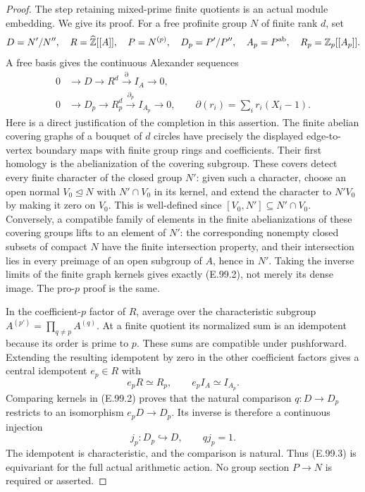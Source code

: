 \begin{proof}
The step retaining mixed-prime finite quotients is an actual module
embedding.  We give its proof.  For a free profinite group \(N\) of
finite rank \(d\), set
\[
 D=N'/N'',\quad R=\widehat{\mathbb Z}[[A]],\quad
 P=N^{(p)},\quad D_p=P'/P'',\quad
 A_p=P^{\rm ab},\quad R_p=\mathbb Z_p[[A_p]].
\]
A free basis gives the continuous Alexander sequences
\[
\begin{aligned}
 0&\longrightarrow D\longrightarrow R^d
          \xrightarrow{\partial}I_A\longrightarrow0,\\
 0&\longrightarrow D_p\longrightarrow R_p^d
          \xrightarrow{\partial_p}I_{A_p}\longrightarrow0,
 \qquad \partial(r_i)=\sum_i r_i(X_i-1).
\end{aligned}                                                   \tag{E.99.2}
\]
Here is a direct justification of the completion in this assertion.
The finite abelian covering graphs of a bouquet of \(d\) circles
have precisely the displayed edge-to-vertex boundary maps with
finite group rings and coefficients.  Their first homology is the
abelianization of the covering subgroup.  These covers detect every
finite character of the closed group \(N'\): given such a character,
choose an open normal \(V_0\trianglelefteq N\) with
\(N'\cap V_0\) in its kernel, and extend the character to \(N'V_0\)
by making it zero on \(V_0\).  This is well-defined since
\([V_0,N']\subseteq N'\cap V_0\).
Conversely, a compatible family of elements in the finite
abelianizations of these covering groups lifts to an element of
\(N'\): the corresponding nonempty closed subsets of compact \(N\)
have the finite intersection property, and their intersection lies
in every preimage of an open subgroup of \(A\), hence in \(N'\).
Taking the inverse limits of the finite graph kernels gives exactly
(E.99.2), not merely its dense image.  The pro-\(p\) proof is the same.

In the coefficient-\(p\) factor of \(R\), average over the
characteristic subgroup \(A^{(p')}=\prod_{q\ne p}A^{(q)}\).
At a finite quotient its normalized sum is an idempotent because its
order is prime to \(p\).  These sums are compatible under pushforward.
Extending the resulting idempotent by zero in the other coefficient
factors gives a central idempotent \(e_p\in R\) with
\[
 e_pR\simeq R_p,\qquad e_pI_A\simeq I_{A_p}.
\]
Comparing kernels in (E.99.2) proves that the natural comparison
\(q:D\to D_p\) restricts to an isomorphism \(e_pD\to D_p\).
Its inverse is therefore a continuous injection
\[
 j_p:D_p\hookrightarrow D,\qquad qj_p=1.                  \tag{E.99.3}
\]
The idempotent is characteristic, and the comparison is natural.
Thus (E.99.3) is equivariant for the full actual arithmetic action.
No group section \(P\to N\) is required or asserted.


\end{proof}
